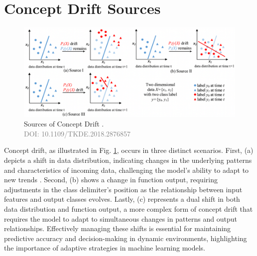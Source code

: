 \section{Concept Drift Sources}
\vspace{-3mm}
\begin{figure}[H]
    \centering
    \includegraphics[width=1.0\textwidth]{2_Background/figures/concept_drift_sources.png}
    \caption{Sources of Concept Drift \cite{8496795}. \\ \textcolor{gray}{\fontsize{10}{0}\selectfont DOI: 10.1109/TKDE.2018.2876857}}
    \label{fig:concept-drift-sources}
\end{figure}
\vspace{-6mm}
\label{sec:background_concept_drift_sources}
Concept drift, as illustrated in Fig. \ref{fig:concept-drift-sources}, occurs in three distinct scenarios. First, (a) depicts a shift in data distribution, indicating changes in the underlying patterns and characteristics of incoming data, challenging the model's ability to adapt to new trends \cite{lu2016concept, gama2014survey, losing2016knn, storkey2008training}. Second, (b) shows a change in function output, requiring adjustments in the class delimiter's position as the relationship between input features and output classes evolves. Lastly, (c) represents a dual shift in both data distribution and function output, a more complex form of concept drift that requires the model to adapt to simultaneous changes in patterns and output relationships. Effectively managing these shifts is essential for maintaining predictive accuracy and decision-making in dynamic environments, highlighting the importance of adaptive strategies in machine learning models.


